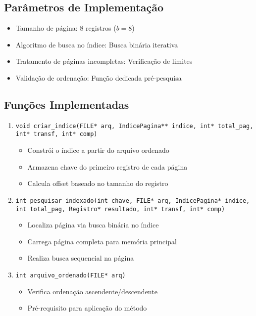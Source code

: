 \documentclass[12pt,a4paper,brazil]{article}
\begin{document}
\subsection{Parâmetros de Implementação}
\begin{itemize}
    \item Tamanho de página: 8 registros (\(b = 8\))
    \item Algoritmo de busca no índice: Busca binária iterativa
    \item Tratamento de páginas incompletas: Verificação de limites
    \item Validação de ordenação: Função dedicada pré-pesquisa
\end{itemize}

\subsection{Funções Implementadas}
\begin{enumerate}
    \item \texttt{void criar\_indice(FILE* arq, IndicePagina** indice, int* total\_pag, int* transf, int* comp)}
    \begin{itemize}
        \item Constrói o índice a partir do arquivo ordenado
        \item Armazena chave do primeiro registro de cada página
        \item Calcula offset baseado no tamanho do registro
    \end{itemize}
    
    \item \texttt{int pesquisar\_indexado(int chave, FILE* arq, IndicePagina* indice, int total\_pag, Registro* resultado, int* transf, int* comp)}
    \begin{itemize}
        \item Localiza página via busca binária no índice
        \item Carrega página completa para memória principal
        \item Realiza busca sequencial na página
    \end{itemize}
    
    \item \texttt{int arquivo\_ordenado(FILE* arq)}
    \begin{itemize}
        \item Verifica ordenação ascendente/descendente
        \item Pré-requisito para aplicação do método
    \end{itemize}
\end{enumerate}
\end{document}
